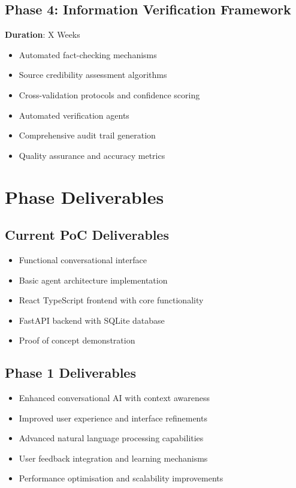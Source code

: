 \documentclass{article}
\begin{document}
\subsection{Phase 4: Information Verification Framework}
\textbf{Duration}: X Weeks
\begin{itemize}
    \item Automated fact-checking mechanisms
    \item Source credibility assessment algorithms
    \item Cross-validation protocols and confidence scoring
    \item Automated verification agents
    \item Comprehensive audit trail generation
    \item Quality assurance and accuracy metrics
\end{itemize}

\section{Phase Deliverables}

\subsection{Current PoC Deliverables}
\begin{itemize}
    \item Functional conversational interface
    \item Basic agent architecture implementation
    \item React TypeScript frontend with core functionality
    \item FastAPI backend with SQLite database
    \item Proof of concept demonstration
\end{itemize}

\subsection{Phase 1 Deliverables}
\begin{itemize}
    \item Enhanced conversational AI with context awareness
    \item Improved user experience and interface refinements
    \item Advanced natural language processing capabilities
    \item User feedback integration and learning mechanisms
    \item Performance optimisation and scalability improvements
\end{itemize}
\end{document}
